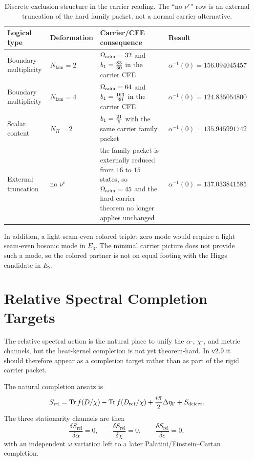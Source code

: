\begin{table}[H]
\centering
\small
\begin{tabularx}{\linewidth}{@{}l l X l@{}}
\toprule
Logical type & Deformation & Carrier/CFE consequence & Result \\
\midrule
Boundary multiplicity & $N_{\mathrm{fam}}=2$ & $\Omega_{\mathrm{adm}}=32$ and $b_1=\frac{83}{30}$ in the carrier CFE & $\alpha^{-1}(0)=\num{156.094045457}$ \\
Boundary multiplicity & $N_{\mathrm{fam}}=4$ & $\Omega_{\mathrm{adm}}=64$ and $b_1=\frac{163}{30}$ in the carrier CFE & $\alpha^{-1}(0)=\num{124.835054800}$ \\
Scalar content & $N_H=2$ & $b_1=\frac{21}{5}$ with the same carrier family packet & $\alpha^{-1}(0)=\num{135.945991742}$ \\
External truncation & no $\nu^c$ & the family packet is externally reduced from $16$ to $15$ states, so $\Omega_{\mathrm{adm}}=45$ and the hard carrier theorem no longer applies unchanged & $\alpha^{-1}(0)=\num{137.033841585}$ \\
\bottomrule
\end{tabularx}
\caption{Discrete exclusion structure in the carrier reading. The ``no $\nu^c$'' row is an external truncation of the hard family packet, not a normal carrier alternative.}
\end{table}

In addition, a light seam-even colored triplet zero mode would require a light seam-even bosonic mode in $E_3$. The minimal carrier picture does not provide such a mode, so the colored partner is not on equal footing with the Higgs candidate in $E_2$.

\section{Relative Spectral Completion Targets}

\begin{tcolorbox}[colback=gray!5, colframe=gray!60, breakable,
    title={\textbf{Status: dynamical target, not part of the hard carrier core}}, fonttitle=\bfseries]
The relative spectral action is the natural place to unify the $\alpha$-, $\chi$-, and metric channels, but the heat-kernel completion is not yet theorem-hard. In v2.9 it should therefore appear as a completion target rather than as part of the rigid carrier packet.
\end{tcolorbox}

The natural completion ansatz is
\[
S_{\mathrm{rel}}
= \operatorname{Tr} f(D/\chi)
- \operatorname{Tr} f(D_{\mathrm{ref}}/\chi)
+ \frac{i\pi}{2}\Delta\eta_\Gamma
+ S_{\mathrm{defect}}.
\]
The three stationarity channels are then
\[
\frac{\delta S_{\mathrm{rel}}}{\delta\alpha}=0,
\qquad
\frac{\delta S_{\mathrm{rel}}}{\delta\chi}=0,
\qquad
\frac{\delta S_{\mathrm{rel}}}{\delta e}=0,
\]
with an independent $\omega$ variation left to a later Palatini/Einstein--Cartan completion.

